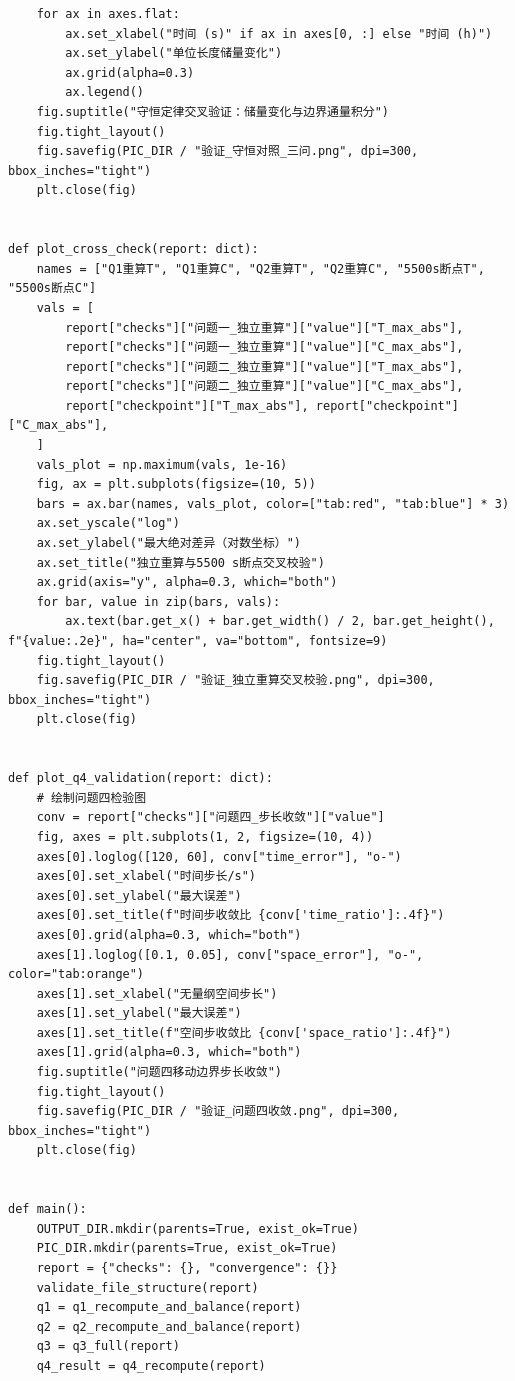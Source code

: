 \documentclass[withoutpreface,bwprint]{cumcm_thesis}
\begin{document}
\begin{appendices}
\begin{lstlisting}
    for ax in axes.flat:
        ax.set_xlabel("时间 (s)" if ax in axes[0, :] else "时间 (h)")
        ax.set_ylabel("单位长度储量变化")
        ax.grid(alpha=0.3)
        ax.legend()
    fig.suptitle("守恒定律交叉验证：储量变化与边界通量积分")
    fig.tight_layout()
    fig.savefig(PIC_DIR / "验证_守恒对照_三问.png", dpi=300, bbox_inches="tight")
    plt.close(fig)


def plot_cross_check(report: dict):
    names = ["Q1重算T", "Q1重算C", "Q2重算T", "Q2重算C", "5500s断点T", "5500s断点C"]
    vals = [
        report["checks"]["问题一_独立重算"]["value"]["T_max_abs"],
        report["checks"]["问题一_独立重算"]["value"]["C_max_abs"],
        report["checks"]["问题二_独立重算"]["value"]["T_max_abs"],
        report["checks"]["问题二_独立重算"]["value"]["C_max_abs"],
        report["checkpoint"]["T_max_abs"], report["checkpoint"]["C_max_abs"],
    ]
    vals_plot = np.maximum(vals, 1e-16)
    fig, ax = plt.subplots(figsize=(10, 5))
    bars = ax.bar(names, vals_plot, color=["tab:red", "tab:blue"] * 3)
    ax.set_yscale("log")
    ax.set_ylabel("最大绝对差异（对数坐标）")
    ax.set_title("独立重算与5500 s断点交叉校验")
    ax.grid(axis="y", alpha=0.3, which="both")
    for bar, value in zip(bars, vals):
        ax.text(bar.get_x() + bar.get_width() / 2, bar.get_height(), f"{value:.2e}", ha="center", va="bottom", fontsize=9)
    fig.tight_layout()
    fig.savefig(PIC_DIR / "验证_独立重算交叉校验.png", dpi=300, bbox_inches="tight")
    plt.close(fig)


def plot_q4_validation(report: dict):
    # 绘制问题四检验图
    conv = report["checks"]["问题四_步长收敛"]["value"]
    fig, axes = plt.subplots(1, 2, figsize=(10, 4))
    axes[0].loglog([120, 60], conv["time_error"], "o-")
    axes[0].set_xlabel("时间步长/s")
    axes[0].set_ylabel("最大误差")
    axes[0].set_title(f"时间步收敛比 {conv['time_ratio']:.4f}")
    axes[0].grid(alpha=0.3, which="both")
    axes[1].loglog([0.1, 0.05], conv["space_error"], "o-", color="tab:orange")
    axes[1].set_xlabel("无量纲空间步长")
    axes[1].set_ylabel("最大误差")
    axes[1].set_title(f"空间步收敛比 {conv['space_ratio']:.4f}")
    axes[1].grid(alpha=0.3, which="both")
    fig.suptitle("问题四移动边界步长收敛")
    fig.tight_layout()
    fig.savefig(PIC_DIR / "验证_问题四收敛.png", dpi=300, bbox_inches="tight")
    plt.close(fig)


def main():
    OUTPUT_DIR.mkdir(parents=True, exist_ok=True)
    PIC_DIR.mkdir(parents=True, exist_ok=True)
    report = {"checks": {}, "convergence": {}}
    validate_file_structure(report)
    q1 = q1_recompute_and_balance(report)
    q2 = q2_recompute_and_balance(report)
    q3 = q3_full(report)
    q4_result = q4_recompute(report)


\end{lstlisting}
\end{appendices}
\end{document}

